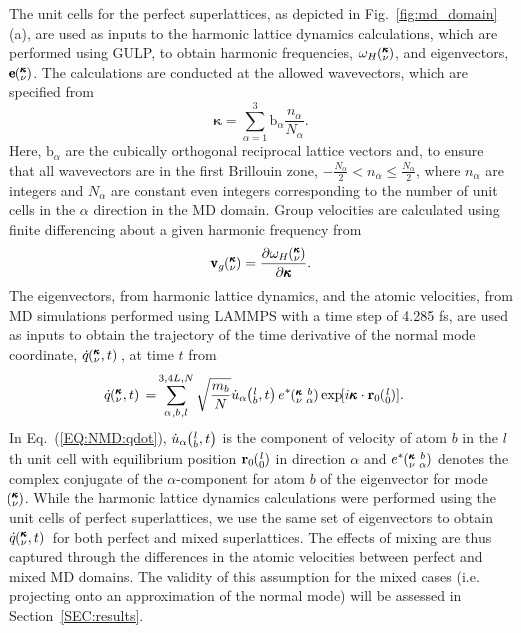 \documentclass[aps,prb,preprint,preprintnumbers,amsmath,amssymb,floatfix,superscriptaddress]{revtex4}
\newcommand{\EXP}[1]{\exp\mspace{-5.0mu}\left[#1\right]\mspace{-3.0mu}}
\newcommand{\SUM}[2]{\ifthenelse{\equal{#1}{0}}{\sum_{
\alpha_{#2},b_{#2},l_{#2}}^{3,4L,N}} {\ifthenelse{\equal{#1}{1}}{\sum_{
\alpha_{#2},b_{#2}}^{3,n}}{\sum_{\pmb{\kappa}#2,\nu#2}^{N,3n}}}}
\newcommand{\ab}[2]{\mspace{-4.0mu}\left(\mspace{-8.0mu}
\begin{smallmatrix}&\ifthenelse{\equal{#1}{}}{a}{#1} \\&\ifthenelse
{\equal{#2}{}}{b}{#2}\end{smallmatrix}\mspace{-3.0mu}\right)}
\newcommand{\kvba}{\mspace{-4.0mu}\left(\mspace{-8.0mu}
\begin{smallmatrix} &\pmb{\kappa} &b \\ &\nu &\alpha\end{smallmatrix}
\mspace{-3.0mu}\right)}
\newcommand{\kvt}{\mspace{-4.0mu}\left(\mspace{-8.0mu}
\begin{smallmatrix}&\pmb{\kappa} \\&\nu\end{smallmatrix}
\mspace{-2.0mu},t\right)}
\newcommand{\kv}{\mspace{-4.0mu}\left(\mspace{-8.0mu}
\begin{smallmatrix}&\pmb{\kappa} \\&\nu\end{smallmatrix}
\mspace{-3.0mu}\right)}
\newcommand{\lbt}{\mspace{-4.0mu}\left(\mspace{-8.0mu}
\begin{smallmatrix}&l \\&b\end{smallmatrix}\mspace{-2.0mu},t\right)}
\begin{document}
The unit cells for the perfect superlattices, as depicted in Fig.~\ref{fig:md_domain}(a), are used as inputs to the harmonic lattice dynamics calculations, which are performed using GULP,\cite{GULP} to obtain harmonic frequencies, $\omega_H \kv$, and eigenvectors, $ \pmb{\mathrm{e}} \kv$. The calculations are conducted at the allowed wavevectors, which are specified from
\begin{equation}\label{EQ:NMD:allowdkpt}
\pmb{\kappa} = \sum_{\alpha=1}^3 \pmb{\mathrm{b}}_{\alpha} \frac{n_{\alpha}}{N_{\alpha}}.
\end{equation}
Here, $\pmb{\mathrm{b}}_\alpha$ are the cubically orthogonal reciprocal lattice vectors and, to ensure that all wavevectors are in the first Brillouin zone, $ -\frac{N_\alpha}{2} < n_\alpha \le \frac {N_\alpha}{2}$, where $n_\alpha$ are integers and $N_\alpha$ are constant even integers corresponding to the number of unit cells in the $\alpha$ direction in the MD domain. Group velocities are calculated using finite differencing about a given harmonic frequency from \cite{ziman_electrons_2001}
\begin{equation}\label{EQ:NMD:vg}
\begin{split}
\pmb{\mathrm{v}}_{g}\kv=\frac{\partial \omega_H \kv}{\partial \pmb{\kappa}}.
\end{split}
\end{equation}
The eigenvectors, from harmonic lattice dynamics, and the atomic velocities, from MD simulations performed using LAMMPS with a time step of 4.285 fs,\cite{LAMMPS} are used as inputs to obtain the trajectory of the time derivative of the normal mode coordinate, $\dot{q}\kvt{}{}{}$, at time $t$ from
\begin{equation}\label{EQ:NMD:qdot}
\begin{split}
\dot{q}\kvt{}{}{}=&\SUM{0}{}\sqrt{\frac{m_b}{N}}\dot{u}_{\alpha}\lbt e^*\kvba\EXP{i\pmb{\kappa}\cdot\mathbf{r}_0\ab{l}{0}}.
\end{split}
\end{equation}
In Eq.~(\ref{EQ:NMD:qdot}), $\dot{u}_{\alpha}\lbt$ is the component of velocity of atom $b$ in the $l$th unit cell with equilibrium position $\mathbf{r}_0\ab{l}{0}$ in direction $\alpha$ and $e^*\kvba$ denotes the complex conjugate of the $\alpha$-component for atom $b$ of the eigenvector for mode  ~$\kv$. While the harmonic lattice dynamics calculations were performed using the unit cells of perfect superlattices, we use the same set of eigenvectors to obtain $\dot{q}\kvt{}{}{}$ for both perfect and mixed superlattices. The effects of mixing are thus captured through the differences in the atomic velocities between perfect and mixed MD domains. The validity of this assumption for the mixed cases (i.e. projecting onto an approximation of the normal mode) will be assessed in Section~\ref{SEC:results}.
\end{document}
